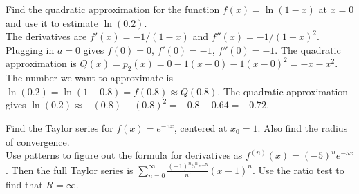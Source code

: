 \documentclass{exam}
\begin{document}
\begin{questions}
\question Find the quadratic approximation for the function $f(x) = \ln(1-x)$ at $x=0$ and use it to estimate $\ln(0.2)$.  
 \\ {\color{red}  The derivatives are $f'(x) = -1/(1-x)$ and $f''(x) = -1/(1-x)^2$.  Plugging in $a=0$ gives $f(0)=0$, $f'(0) = -1$, $f''(0) = -1$.  The quadratic approximation is $Q(x) = p_2(x) = 0 -1(x-0)-1(x-0)^2 = -x-x^2$.  The number we want to approximate is $\ln(0.2)=\ln(1-0.8)=f(0.8) \approx Q(0.8)$.  The quadratic approximation gives $\ln(0.2) \approx -(0.8)-(0.8)^2 = -0.8-0.64 = -0.72 $.}
\thispagestyle{empty}

\question Find the Taylor series for $f(x) = e^{-5x}$, centered at $x_0 = 1$. Also find the radius of convergence.  
 \\ {\color{red} Use patterns to figure out the formula for derivatives as $f^{(n)}(x)=(-5)^ne^{-5x}$.  Then the full Taylor series is $\displaystyle\sum_{n=0}^\infty \frac{(-1)^n 5^n e^{-5}}{n!}(x-1)^n$.  Use the ratio test to find that $R=\infty$.}







\end{questions}
\end{document}
